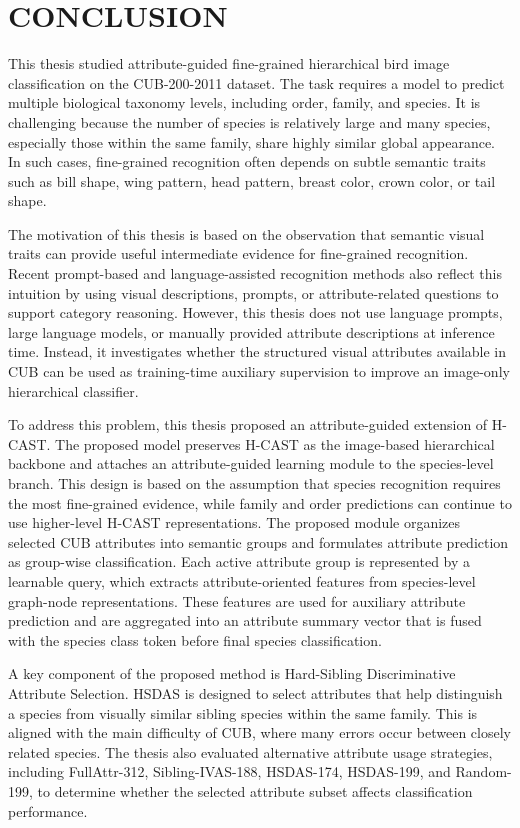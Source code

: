 \chapter{CONCLUSION}
\label{chap:conclusion}

This thesis studied attribute-guided fine-grained hierarchical bird image classification on the CUB-200-2011 dataset. The task requires a model to predict multiple biological taxonomy levels, including order, family, and species. It is challenging because the number of species is relatively large and many species, especially those within the same family, share highly similar global appearance. In such cases, fine-grained recognition often depends on subtle semantic traits such as bill shape, wing pattern, head pattern, breast color, crown color, or tail shape.

The motivation of this thesis is based on the observation that semantic visual traits can provide useful intermediate evidence for fine-grained recognition. Recent prompt-based and language-assisted recognition methods also reflect this intuition by using visual descriptions, prompts, or attribute-related questions to support category reasoning. However, this thesis does not use language prompts, large language models, or manually provided attribute descriptions at inference time. Instead, it investigates whether the structured visual attributes available in CUB can be used as training-time auxiliary supervision to improve an image-only hierarchical classifier.

To address this problem, this thesis proposed an attribute-guided extension of H-CAST. The proposed model preserves H-CAST as the image-based hierarchical backbone and attaches an attribute-guided learning module to the species-level branch. This design is based on the assumption that species recognition requires the most fine-grained evidence, while family and order predictions can continue to use higher-level H-CAST representations. The proposed module organizes selected CUB attributes into semantic groups and formulates attribute prediction as group-wise classification. Each active attribute group is represented by a learnable query, which extracts attribute-oriented features from species-level graph-node representations. These features are used for auxiliary attribute prediction and are aggregated into an attribute summary vector that is fused with the species class token before final species classification.

A key component of the proposed method is Hard-Sibling Discriminative Attribute Selection. HSDAS is designed to select attributes that help distinguish a species from visually similar sibling species within the same family. This is aligned with the main difficulty of CUB, where many errors occur between closely related species. The thesis also evaluated alternative attribute usage strategies, including FullAttr-312, Sibling-IVAS-188, HSDAS-174, HSDAS-199, and Random-199, to determine whether the selected attribute subset affects classification performance.

